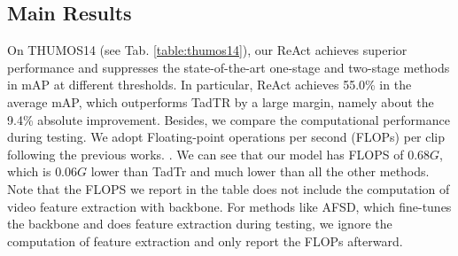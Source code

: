 \documentclass[runningheads]{llncs}
\newcommand{\tabref}[1]{Tab. \ref{#1}}
\def\name{ReAct }
\begin{document}
\subsection{Main Results}
On THUMOS14 (see \tabref{table:thumos14}), our \name achieves superior performance and suppresses the state-of-the-art one-stage and two-stage methods in mAP at different thresholds. In particular, \name achieves 55.0\% in the average mAP, which outperforms TadTR by a large margin, namely about the 9.4\% absolute improvement. Besides, we compare the computational performance during testing. We adopt Floating-point operations per second (FLOPs) per clip following the previous works. \cite{liu2021end,zhu2021enriching}. We can see that our model has FLOPS of $0.68 G$, which is $0.06 G$ lower than TadTr and much lower than all the other methods. Note that the FLOPS we report in the table does not include the computation of video feature extraction with backbone. For methods like AFSD, which fine-tunes the backbone and does feature extraction during testing, we ignore the computation of feature extraction and only report the FLOPs afterward. 
  
\end{document}
